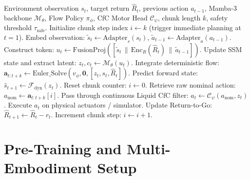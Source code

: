 \documentclass{article}
\begin{document}
\begin{algorithm}[tb]
\caption{HDML Dual-Rate Inference with PACE Safety Watchdog}
\label{alg:hdml_inference}
\begin{algorithmic}[1]
\REQUIRE Environment observation $s_t$, target return $\hat{R}_t$, previous action $a_{t-1}$, Mamba-3 backbone $\mathcal{M}_\theta$, Flow Policy $\pi_\phi$, CfC Motor Head $\mathcal{C}_\psi$, chunk length $k$, safety threshold $\tau_{\text{safe}}$.
\STATE Initialize chunk step index $i \leftarrow k$ (trigger immediate planning at $t=1$).
        \STATE Embed observation: $\tilde{s}_t \leftarrow \text{Adapter}_s(s_t)$, $\tilde{a}_{t-1} \leftarrow \text{Adapter}_a(a_{t-1})$.
        \STATE Construct token: $u_t \leftarrow \text{FusionProj}([\tilde{s}_t \,\|\, \text{Enc}_R(\hat{R}_t) \,\|\, \tilde{a}_{t-1}])$.
        \STATE Update SSM state and extract latent: $z_t, c_t \leftarrow \mathcal{M}_\theta(u_t)$.
        \STATE Integrate deterministic flow: $\mathbf{a}_{t:t+k} \leftarrow \text{Euler\_Solve}(v_\phi, \mathbf{0}, [z_t, s_t, \hat{R}_t])$.
        \STATE Predict forward state: $\hat{s}_{t+1} \leftarrow \mathcal{F}_{\text{dyn}}(z_t)$.
        \STATE Reset chunk counter: $i \leftarrow 0$.
    \ENDIF
    \STATE Retrieve raw nominal action: $a_{\text{nom}} \leftarrow \mathbf{a}_{t:t+k}[i]$.
    \STATE Pass through continuous Liquid CfC filter: $a_t \leftarrow \mathcal{C}_\psi(a_{\text{nom}}, z_t)$.
    \STATE Execute $a_t$ on physical actuators / simulator.
    \STATE Update Return-to-Go: $\hat{R}_{t+1} \leftarrow \hat{R}_t - r_t$.
    \STATE Increment chunk step: $i \leftarrow i + 1$.
\ENDFOR
\end{algorithmic}
\end{algorithm}

\section{Pre-Training and Multi-Embodiment Setup}
\label{sec:setup}
\end{document}
